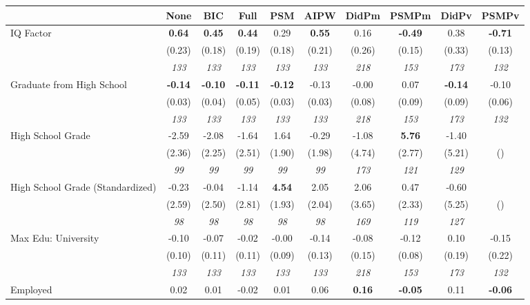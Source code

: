 \begin{tabular}{l c c c c c c c c c}
\toprule
 & None & BIC & Full & PSM & AIPW & DidPm & PSMPm & DidPv & PSMPv \\
\midrule
IQ Factor & \textbf{ 0.64 } & \textbf{ 0.45 } & \textbf{ 0.44 } & 0.29 & \textbf{0.55} & 0.16 & \textbf{-0.49} & 0.38 & \textbf{-0.71} \\
& (0.23) & (0.18) & (0.19) & (0.18) & (0.21) & (0.26) & (0.15) & (0.33) & (0.13) \\
& \textit{ 133 } & \textit{ 133 } & \textit{ 133 } & \textit{ 133 } & \textit{ 133 } & \textit{ 218 } & \textit{ 153 } & \textit{ 173 } & \textit{ 132 } \\
Graduate from High School & \textbf{ -0.14 } & \textbf{ -0.10 } & \textbf{ -0.11 } & \textbf{-0.12} & -0.13 & -0.00 & 0.07 & \textbf{ -0.14 } & -0.10 \\
& (0.03) & (0.04) & (0.05) & (0.03) & (0.03) & (0.08) & (0.09) & (0.09) & (0.06) \\
& \textit{ 133 } & \textit{ 133 } & \textit{ 133 } & \textit{ 133 } & \textit{ 133 } & \textit{ 218 } & \textit{ 153 } & \textit{ 173 } & \textit{ 132 } \\
High School Grade & -2.59 & -2.08 & -1.64 & 1.64 & -0.29 & -1.08 & \textbf{5.76} & -1.40 & \\
& (2.36) & (2.25) & (2.51) & (1.90) & (1.98) & (4.74) & (2.77) & (5.21) & () \\
& \textit{ 99 } & \textit{ 99 } & \textit{ 99 } & \textit{ 99 } & \textit{ 99 } & \textit{ 173 } & \textit{ 121 } & \textit{ 129 } & \\
High School Grade (Standardized) & -0.23 & -0.04 & -1.14 & \textbf{4.54} & 2.05 & 2.06 & 0.47 & -0.60 & \\
& (2.59) & (2.50) & (2.81) & (1.93) & (2.04) & (3.65) & (2.33) & (5.25) & () \\
& \textit{ 98 } & \textit{ 98 } & \textit{ 98 } & \textit{ 98 } & \textit{ 98 } & \textit{ 169 } & \textit{ 119 } & \textit{ 127 } & \\
Max Edu: University & -0.10 & -0.07 & -0.02 & -0.00 & -0.14 & -0.08 & -0.12 & 0.10 & -0.15 \\
& (0.10) & (0.11) & (0.11) & (0.09) & (0.13) & (0.15) & (0.08) & (0.19) & (0.22) \\
& \textit{ 133 } & \textit{ 133 } & \textit{ 133 } & \textit{ 133 } & \textit{ 133 } & \textit{ 218 } & \textit{ 153 } & \textit{ 173 } & \textit{ 132 } \\
Employed & 0.02 & 0.01 & -0.02 & 0.01 & 0.06 & \textbf{ 0.16 } & \textbf{-0.05} & 0.11 & \textbf{-0.06} \\

\end{tabular}

